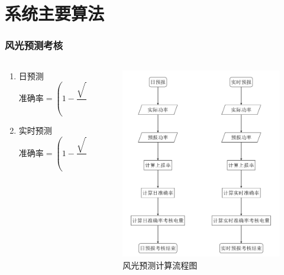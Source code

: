 \documentclass[aspectratio=43, 10pt, utf8, mathserif]{beamer}
\begin{document}
	\section{系统主要算法}
			\begin{frame}
		\frametitle{风光预测考核}
		
		\begin{columns}
			
			\begin{column}{.4\linewidth}
			\begin{enumerate}
				\item 日预测
				\begin{equation}\label{pre_wind_day}
					\texttt{准确率}=(1-\dfrac{\sqrt{\sum\limits_{i=1}^{n}(P_{Mi}-P_{Pi})^2}}{Cap\sqrt{n}})\nonumber
				\end{equation}
				
				\item 实时预测
				\begin{equation}\label{pre_wind_rt}
					\texttt{准确率}=(1-\dfrac{\sqrt{\sum\limits_{i=1}^{n}(P_{Mi}-P_{Pi,t})^2}}{Cap\sqrt{n}})\nonumber
				\end{equation}
				
			\end{enumerate}
			\end{column}
			
			\begin{column}{.6\linewidth}
			\begin{figure}[H]
				\centering
				\includegraphics[width=0.75\linewidth]{pic/screenshot028}
				\caption{风光预测计算流程图}
				\label{fig:screenshot028}
			\end{figure}
			
			\end{column}
		\end{columns}
	\end{frame}
\end{document}
